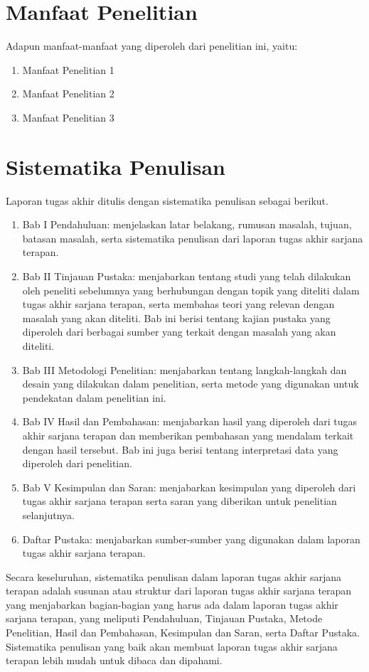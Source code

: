 \section{Manfaat Penelitian}
Adapun manfaat-manfaat yang diperoleh dari penelitian ini, yaitu:
\begin{enumerate}
    \item Manfaat Penelitian 1
    \item Manfaat Penelitian 2
    \item Manfaat Penelitian 3
\end{enumerate}

\section{Sistematika Penulisan}
Laporan tugas akhir ditulis dengan sistematika penulisan sebagai berikut.
\begin{enumerate}
    \item Bab I Pendahuluan: menjelaskan latar belakang, rumusan masalah, tujuan, batasan masalah, serta sistematika penulisan dari laporan tugas akhir sarjana terapan.
    \item Bab II Tinjauan Pustaka: menjabarkan tentang studi yang telah dilakukan oleh peneliti sebelumnya yang berhubungan dengan topik yang diteliti dalam tugas akhir sarjana terapan, serta membahas teori yang relevan dengan masalah yang akan diteliti. Bab ini berisi tentang kajian pustaka yang diperoleh dari berbagai sumber yang terkait dengan masalah yang akan diteliti.
    \item Bab III Metodologi Penelitian: menjabarkan tentang langkah-langkah dan desain yang dilakukan dalam penelitian, serta metode yang digunakan untuk pendekatan dalam penelitian ini.
    \item Bab IV Hasil dan Pembahasan: menjabarkan hasil yang diperoleh dari tugas akhir sarjana terapan dan memberikan pembahasan yang mendalam terkait dengan hasil tersebut. Bab ini juga berisi tentang interpretasi data yang diperoleh dari penelitian.
    \item Bab V Kesimpulan dan Saran: menjabarkan kesimpulan yang diperoleh dari tugas akhir sarjana terapan serta saran yang diberikan untuk penelitian selanjutnya.
    \item Daftar Pustaka: menjabarkan sumber-sumber yang digunakan dalam laporan tugas akhir sarjana terapan.
\end{enumerate}

Secara keseluruhan, sistematika penulisan dalam laporan tugas akhir sarjana terapan adalah susunan atau struktur dari laporan tugas akhir sarjana terapan yang menjabarkan bagian-bagian yang harus ada dalam laporan tugas akhir sarjana terapan, yang meliputi Pendahuluan, Tinjauan Pustaka, Metode Penelitian, Hasil dan Pembahasan, Kesimpulan dan Saran, serta Daftar Pustaka. Sistematika penulisan yang baik akan membuat laporan tugas akhir sarjana terapan lebih mudah untuk dibaca dan dipahami.